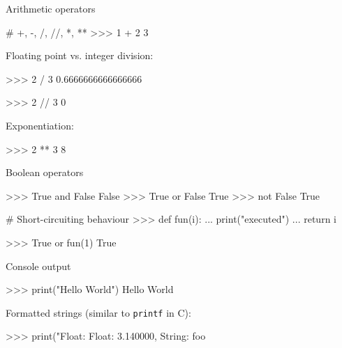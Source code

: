 \documentclass[10pt]{beamer}
\begin{document}
\begin{frame}[fragile]{Arithmetic operators}

\begin{pythoncode}
# +, -, /, //, *, **
>>> 1 + 2
3
\end{pythoncode}



Floating point vs. integer division:

\begin{pythoncode}
>>> 2 / 3
0.6666666666666666

>>> 2 // 3
0
\end{pythoncode}



Exponentiation:

\begin{pythoncode}
>>> 2 ** 3
8
\end{pythoncode}
\end{frame}


\begin{frame}[fragile]{Boolean operators}

\begin{pythoncode}
>>> True and False
False
>>> True or False
True
>>> not False
True
\end{pythoncode}



\begin{pythoncode}
# Short-circuiting behaviour
>>> def fun(i):
...     print("executed")
...     return i

>>> True or fun(1)
True
\end{pythoncode}

\end{frame}


\begin{frame}[fragile]{Console output}

\begin{pythoncode}
>>> print("Hello World")
Hello World
\end{pythoncode}



Formatted strings (similar to \texttt{printf} in C):

\begin{pythoncode}
>>> print("Float: %
Float: 3.140000, String: foo
\end{pythoncode}

\end{frame}
\end{document}
